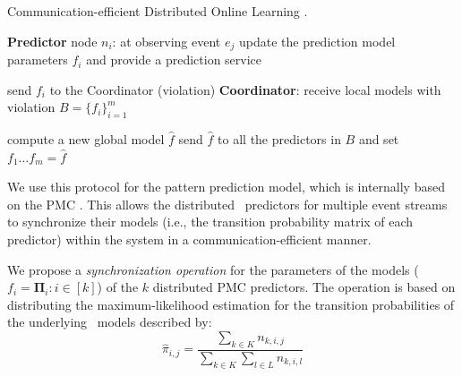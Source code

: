 \begin{algorithm}[h]
	\caption{Communication-efficient Distributed Online Learning \cite{kamp2014communication}.} 
	\begin{algorithmic}[1] 
		\Statex \Indm  \textbf{Predictor} node $n_i$: at observing event $e_j$
		\Statex \Indp update the prediction model parameters $f_i$ and provide a prediction service \; 

		\Statex {}  
		\Statex send  $f_i$ to the Coordinator (violation) \;
		\Statex \Indm \textbf{Coordinator}:
		\Statex \Indp receive local models with violation 
		 $B=\{f_i\}_{i=1}^m$ \;
	
	
		\Statex {}
        \Statex
		\Statex compute a new global model $\hat{f}$ \;
		\Statex send $\hat{f}$ to all the predictors in $B$ and set $f_{1}\dots f_{m}=\hat{f} $\; 
		\Statex {}
	
	\end{algorithmic}
	\label{algonline:dol}
\end{algorithm}


\par  We use this protocol for the pattern prediction model, which is internally based on the PMC \pmcmr. This allows the distributed \pmcmr\ predictors for multiple event streams to  synchronize their models (i.e., the transition probability matrix of each predictor) within the system in a communication-efficient manner. 



\par We propose a \textit{synchronization operation} for the parameters of the models ($f_i=\boldsymbol{\Pi}_i :i \in[k]$) of the $k$ distributed PMC predictors. The operation is based on distributing the maximum-likelihood estimation \cite{anderson1957statistical} for the transition probabilities of the underlying \pmcmr\ models described by: 
\begin{equation}
\label{eq:dis_pi_estim}
\hat{\pi}_{i,j}=\frac{\sum_{k \in K} n_{k,i,j}}{\sum_{k \in K} \sum_{l \in L} n_{k,i,l}}
\end{equation}

